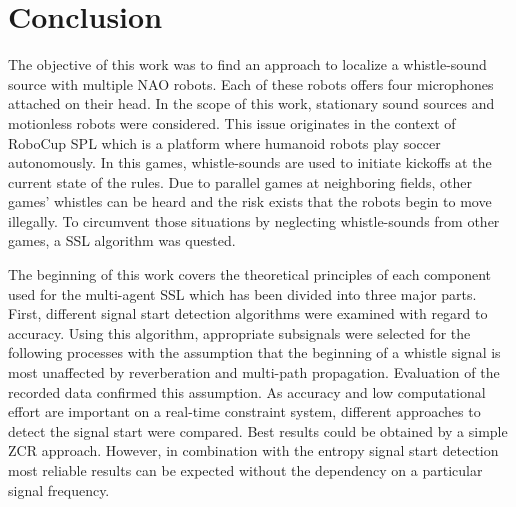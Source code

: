 \chapter{Conclusion}
\label{chap:05_conclusion}


The objective of this work was to find an approach to localize a whistle-sound
source with multiple NAO robots.
Each of these robots offers four microphones attached on their head.
In the scope of this work, stationary sound sources and motionless robots were
considered.
This issue originates in the context of \ac{RoboCup} \ac{SPL} which is a
platform where humanoid robots play soccer autonomously.
In this games, whistle-sounds are used to initiate kickoffs at the current state of the rules.
Due to parallel games at neighboring fields, other games' whistles can be heard and
the risk exists that the robots begin to move illegally.
To circumvent those situations by neglecting whistle-sounds from other
games, a \acf{SSL} algorithm was quested. 

The beginning of this work covers the theoretical principles of each component
used for the multi-agent \ac{SSL} which has been divided into three major parts.
First, different signal start detection algorithms were examined with regard to accuracy.
Using this algorithm, appropriate subsignals were selected for the following processes with the
assumption that the beginning of a whistle signal is most unaffected by
reverberation and multi-path propagation.
Evaluation of the recorded data confirmed this assumption.
As accuracy and low computational effort are important on a real-time constraint
system, different approaches to detect the signal start were compared.
Best results could be obtained by a simple \ac{ZCR} approach.
However, in combination with the entropy signal start detection
most reliable results can be expected without the dependency on a
particular signal frequency.


